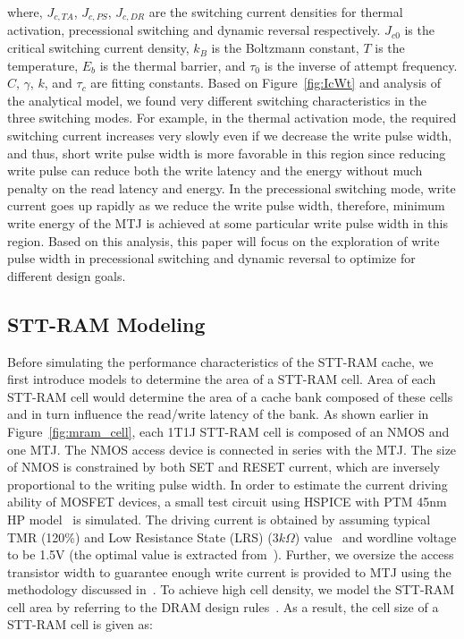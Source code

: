 where, $J_{c,TA}$, $J_{c,PS}$, $J_{c,DR}$ are the switching current densities for thermal activation,
precessional switching and dynamic reversal respectively. $J_{c0}$ is the critical switching current
density, $k_{B}$ is the Boltzmann constant, $T$ is the temperature, $E_{b}$ is the thermal barrier,
and $\tau_{0}$ is the inverse of attempt frequency. $C$, $\gamma$, $k$, and $\tau_{c}$ are fitting
constants. Based on Figure~\ref{fig:IcWt} and analysis of the analytical model, we found very
different switching characteristics in the three switching modes. For example, in the thermal
activation mode, the required switching current increases very slowly even if we decrease the write
pulse width, and thus, short write pulse width is more favorable in this
region since reducing write pulse can reduce both the write latency and the energy without much penalty on
the read latency and energy. In the precessional switching mode, write current goes up rapidly as we
reduce the write pulse width, therefore, minimum write energy of the MTJ is achieved at some
particular write pulse width in this region. Based on this analysis, this paper will focus on the
exploration of write pulse width in precessional switching and dynamic reversal to optimize for
different design goals.

\subsection{STT-RAM Modeling}

Before simulating the performance characteristics of the STT-RAM cache, we first introduce models to
determine the area of a STT-RAM cell. Area of each STT-RAM cell would determine the area of a cache
bank composed of these cells and in turn influence the read/write latency of the bank. As shown
earlier in Figure~\ref{fig:mram_cell}, each 1T1J STT-RAM cell is composed of an NMOS and one MTJ. The
NMOS access device is connected in series with the MTJ. The size of NMOS is constrained by both SET
and RESET current, which are inversely proportional to the writing pulse width. In order to estimate
the current driving ability of MOSFET devices, a small test circuit using HSPICE with PTM 45nm HP
model~\cite{PTM} is simulated. The driving current is obtained by assuming typical TMR (120\%) and
Low Resistance State (LRS) ($3k\Omega$) value~\cite{STTRAM:Qualcomm09} and wordline voltage to be 1.5V (the optimal value is
extracted from~\cite{STTRAM:Gatech10}). Further, we oversize the access transistor width to guarantee
enough write current is provided to MTJ using the methodology discussed in~\cite{STTRAM:RPI10}. To
achieve high cell density, we model the STT-RAM cell area by referring to the DRAM design
rules~\cite{DRAM:6F2}.  As a result, the cell size of a STT-RAM cell is given as:

